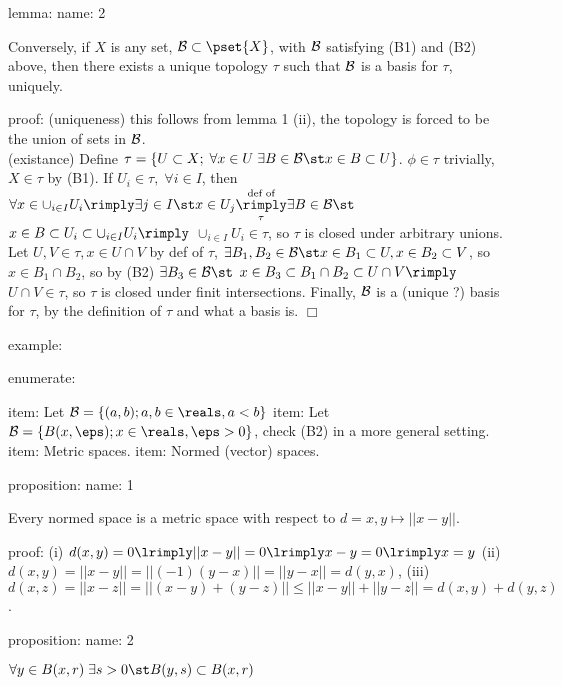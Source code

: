     lemma:
        name:
            2
        
        Conversely, if $X$ is any set, $\B \subset \pset{X}$, with $\mathcal{B}$ satisfying (B1) and (B2) above, then there exists a unique topology $\tau$ such that $\mathcal{B}$ is a basis for $\tau$, uniquely.

        proof:
            (uniqueness) this follows from lemma 1 (ii), the topology is forced to be the union of sets in $\mathcal{B}$. \\
            (existance) Define $\tau = \{ U \subset X; \; \forall x \in U \; \exists B \in \B \st x \in B \subset U \}$. $\phi \in \tau$ trivially, $X \in \tau$ by (B1). If $U_i \in \tau, \; \forall i \in I$, then $\forall x \in \cup_{i \in I} U_i \rimply \exists j \in I \st x \in U_j  \underset{\tau}{\overset{\textrm{def of} }{\rimply}} \exists B \in \B \st$ $ x \in B \subset U_i \subset \cup_{i \in I} U_i \rimply $ $ \cup_{i \in I} U_i \in \tau$, so $\tau$ is closed under arbitrary unions. Let $U, V \in \tau, x \in U \cap V$ by def of $\tau$, $\exists B_1, B_2 \in \B \st x \in B_1 \subset U, x \in B_2 \subset V$, so $x \in B_1 \cap B_2$, so by (B2) $\exists B_3 \in \B \st$ $ x \in B_3 \subset B_1 \cap B_2 \subset U \cap V \rimply$ $ U \cap V \in \tau$, so $\tau$ is closed under finit intersections. Finally, $\mathcal{B}$ is a (unique ?) basis for $\tau$, by the definition of $\tau$ and what a basis is. $\Box$

    example:
        
        enumerate:
            
            item:
                Let $\B = \{ (a,b); a,b \in \reals, a<b \}$
            item:
                Let $\B = \{ B(x, \eps); x \in \reals, \eps>0 \}$, check (B2) in a more general setting.
            item:
                Metric spaces.
            item:
                Normed (vector) spaces.
            
    proposition:
        name:
            1

        Every normed space is a metric space with respect to $d = x,y \mapsto ||x-y||$.

        proof:
            (i) $ d(x,y)=0 \lrimply ||x-y||=0 \lrimply x-y = 0 \lrimply x=y$ (ii) $d(x,y) = ||x-y|| = ||(-1)(y-x)|| = ||y-x|| = d(y,x)$, (iii) $d(x,z) = ||x-z|| = ||(x-y)+(y-z)|| \le ||x-y|| + ||y - z|| = d(x,y) + d(y,z)$.

    proposition:
        name:
            2
            
        $\forall y \in B(x,r) \; \exists s > 0 \st B(y,s) \subset B(x,r)$
            
